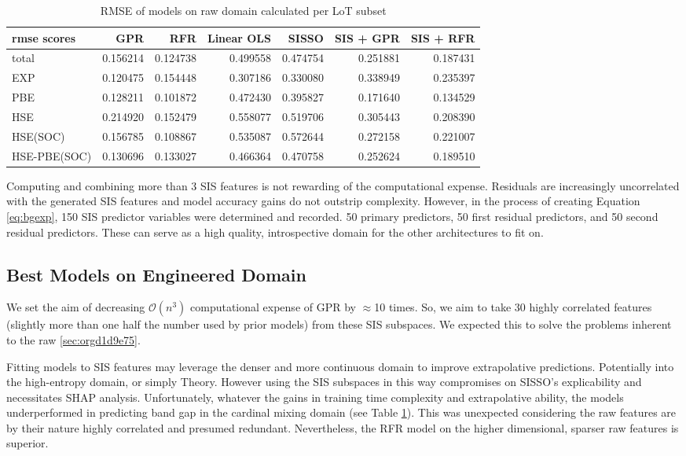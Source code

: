 \begin{table}[htbp]
\caption{\label{tbl:LoTscores} RMSE of models on raw domain calculated per LoT subset}
\centering
\begin{tabular}{lrrrrrr}
rmse scores & GPR & RFR & Linear OLS & SISSO & SIS + GPR & SIS + RFR\\[0pt]
\hline
total & 0.156214 & 0.124738 & 0.499558 & 0.474754 & 0.251881 & 0.187431\\[0pt]
EXP & 0.120475 & 0.154448 & 0.307186 & 0.330080 & 0.338949 & 0.235397\\[0pt]
PBE & 0.128211 & 0.101872 & 0.472430 & 0.395827 & 0.171640 & 0.134529\\[0pt]
HSE & 0.214920 & 0.152479 & 0.558077 & 0.519706 & 0.305443 & 0.208390\\[0pt]
HSE(SOC) & 0.156785 & 0.108867 & 0.535087 & 0.572644 & 0.272158 & 0.221007\\[0pt]
HSE-PBE(SOC) & 0.130696 & 0.133027 & 0.466364 & 0.470758 & 0.252624 & 0.189510\\[0pt]
\end{tabular}
\end{table}

Computing and combining more than 3 SIS features is not rewarding of the computational expense.
Residuals are increasingly uncorrelated with the generated SIS features and model accuracy gains do not outstrip complexity.
However, in the process of creating Equation \ref{eq:bgexp}, 150 SIS predictor variables were determined and recorded.
50 primary predictors, 50 first residual predictors, and 50 second residual predictors.
These can serve as a high quality, introspective domain for the other architectures to fit on.

\subsection{Best Models on Engineered Domain}
\label{sec:org3c8eaf2}
We set the aim of decreasing \(\mathcal{O}(n^3)\) computational expense of GPR by \(\approx\)10 times.
So, we aim to take 30 highly correlated features (slightly more than one half the number used by prior models) from these SIS subspaces.
We expected this to solve the problems inherent to the raw \ref{sec:orgd1d9e75}.

Fitting models to SIS features may leverage the denser and more continuous domain to improve extrapolative predictions.
Potentially into the high-entropy domain, or simply Theory.
However using the SIS subspaces in this way compromises on SISSO's explicability and necessitates SHAP analysis.
Unfortunately, whatever the gains in training time complexity and extrapolative ability, the models underperformed in predicting band gap in the cardinal mixing domain (see Table \ref{tbl:LoTscores}).
This was unexpected considering the raw features are by their nature highly correlated and presumed redundant.
Nevertheless, the RFR model on the higher dimensional, sparser raw features is superior.

